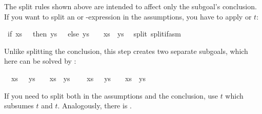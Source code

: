 \begin{isabellebody}
\begin{isamarkuptext}
The split rules shown above are intended to affect only the subgoal's
conclusion.  If you want to split an  or -expression
in the assumptions, you have to apply  or
$t$:%
\end{isamarkuptext}%
\isamarkuptrue%
\ {\isachardoublequote}if\ xs\ {\isacharequal}\ {\isacharbrackleft}{\isacharbrackright}\ then\ ys\ {\isasymnoteq}\ {\isacharbrackleft}{\isacharbrackright}\ else\ ys\ {\isacharequal}\ {\isacharbrackleft}{\isacharbrackright}\ {\isasymLongrightarrow}\ xs\ {\isacharat}\ ys\ {\isasymnoteq}\ {\isacharbrackleft}{\isacharbrackright}{\isachardoublequote}\isanewline
\isamarkupfalse%
split\ split{\isacharunderscore}if{\isacharunderscore}asm{\isacharparenright}\isamarkupfalse%
%
\begin{isamarkuptxt}%
\noindent
Unlike splitting the conclusion, this step creates two
separate subgoals, which here can be solved by :
\begin{isabelle}%
\ {}{\isachardot}\ {\isasymlbrakk}xs\ {\isacharequal}\ {\isacharbrackleft}{\isacharbrackright}{\isacharsemicolon}\ ys\ {\isasymnoteq}\ {\isacharbrackleft}{\isacharbrackright}{\isasymrbrakk}\ {\isasymLongrightarrow}\ xs\ {\isacharat}\ ys\ {\isasymnoteq}\ {\isacharbrackleft}{\isacharbrackright}\isanewline
\ {}{\isachardot}\ {\isasymlbrakk}xs\ {\isasymnoteq}\ {\isacharbrackleft}{\isacharbrackright}{\isacharsemicolon}\ ys\ {\isacharequal}\ {\isacharbrackleft}{\isacharbrackright}{\isasymrbrakk}\ {\isasymLongrightarrow}\ xs\ {\isacharat}\ ys\ {\isasymnoteq}\ {\isacharbrackleft}{\isacharbrackright}%
\end{isabelle}
If you need to split both in the assumptions and the conclusion,
use $t$ which subsumes $t$ and
$t$. Analogously, there is .


\end{isamarkuptxt}
\end{isabellebody}
